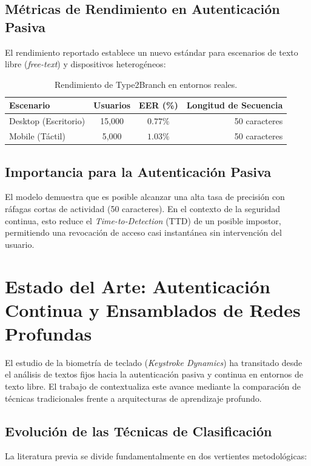 \subsection{Métricas de Rendimiento en Autenticación Pasiva}
El rendimiento reportado establece un nuevo estándar para escenarios de texto libre (\textit{free-text}) y dispositivos heterogéneos:

\begin{table}[h]
\centering
\caption{Rendimiento de Type2Branch en entornos reales.}
\begin{tabular}{l|c|c|r}
\hline
\textbf{Escenario} & \textbf{Usuarios} & \textbf{EER (\%)} & \textbf{Longitud de Secuencia} \\
\hline
Desktop (Escritorio) & 15,000 & $0.77\%$ & 50 caracteres \\
Mobile (Táctil) & 5,000 & $1.03\%$ & 50 caracteres \\
\hline
\end{tabular}
\end{table}

\subsection{Importancia para la Autenticación Pasiva}
El modelo demuestra que es posible alcanzar una alta tasa de precisión con ráfagas cortas de actividad (50 caracteres). En el contexto de la seguridad continua, esto reduce el \textit{Time-to-Detection} (TTD) de un posible impostor, permitiendo una revocación de acceso casi instantánea sin intervención del usuario.

\section{Estado del Arte: Autenticación Continua y Ensamblados de Redes Profundas}

El estudio de la biometría de teclado (\textit{Keystroke Dynamics}) ha transitado desde el análisis de textos fijos hacia la autenticación pasiva y continua en entornos de texto libre. El trabajo de \cite{deepkeystroke2022} contextualiza este avance mediante la comparación de técnicas tradicionales frente a arquitecturas de aprendizaje profundo.

\subsection{Evolución de las Técnicas de Clasificación}
La literatura previa se divide fundamentalmente en dos vertientes metodológicas:

